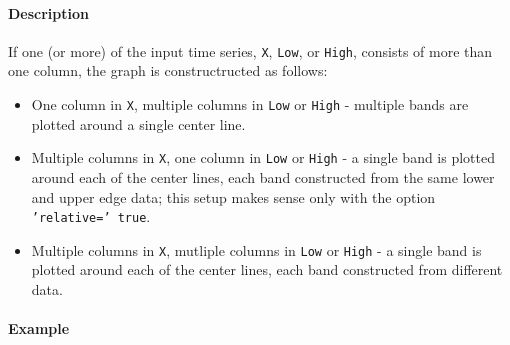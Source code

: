 \paragraph{Description}

If one (or more) of the input time series, \texttt{X}, \texttt{Low}, or
\texttt{High}, consists of more than one column, the graph is
constructructed as follows:

\begin{itemize}
\item
  One column in \texttt{X}, multiple columns in \texttt{Low} or
  \texttt{High} - multiple bands are plotted around a single center
  line.
\item
  Multiple columns in \texttt{X}, one column in \texttt{Low} or
  \texttt{High} - a single band is plotted around each of the center
  lines, each band constructed from the same lower and upper edge data;
  this setup makes sense only with the option \texttt{'relative=' true}.
\item
  Multiple columns in \texttt{X}, mutliple columns in \texttt{Low} or
  \texttt{High} - a single band is plotted around each of the center
  lines, each band constructed from different data.
\end{itemize}

\paragraph{Example}


